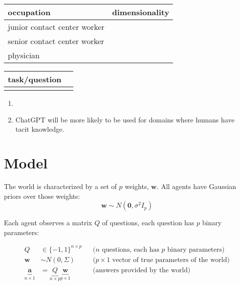 \documentclass[
  11pt,
  letterpaper,
  DIV=11,
  numbers=noendperiod,
  oneside]{scrartcl}
\providecommand{\tightlist}{%
  \setlength{\itemsep}{0pt}\setlength{\parskip}{0pt}}\usepackage{longtable,booktabs,array}
\newcommand{\bm}[1]{\boldsymbol{#1}}
\newcommand{\ut}[2]{\underbrace{#1}_{\text{#2}}}
\begin{document}
\begin{longtable}[]{@{}ll@{}}
\toprule\noalign{}
occupation & dimensionality \\
\midrule\noalign{}
\endhead
\bottomrule\noalign{}
\endlastfoot
junior contact center worker & \\
senior contact center worker & \\
physician & \\
\end{longtable}

\begin{longtable}[]{@{}ll@{}}
\toprule\noalign{}
task/question & \\
\midrule\noalign{}
\endhead
\bottomrule\noalign{}
\endlastfoot
& \\
\end{longtable}

\begin{description}
\tightlist
\item[Additional things we'd like to add:]
\begin{enumerate}
\def\labelenumi{\arabic{enumi}.}
\tightlist
\item[]
\item
  ChatGPT will be more likely to be used for domains where humans have
  tacit knowledge.
\end{enumerate}
\end{description}

\section{Model}\label{model}

The world is characterized by a set of \(p\) weights, \(\bm{w}\). All
agents have Gaussian priors over those weights:
\[\bm{w}\sim N(\bm{0},\sigma^2I_p)\]

Each agent observes a matrix \(Q\) of questions, each question has \(p\)
binary parameters:

\[\begin{aligned}
      Q      &\in \{-1,1\}^{n\times p}
         && \text{($n$ questions, each has $p$ binary parameters)}\\
      \bm{w} &\sim N(0,\Sigma) 
         && (p\times 1\text{ vector of true parameters of the world)}\\
      \ut{\bm{a}}{$n\times1$}   &= \ut{Q}{$n\times p$}\ut{\bm{w}}{$p\times1$}
         && \text{(answers provided by the world)}\\
   \end{aligned}
   \]
\end{document}
